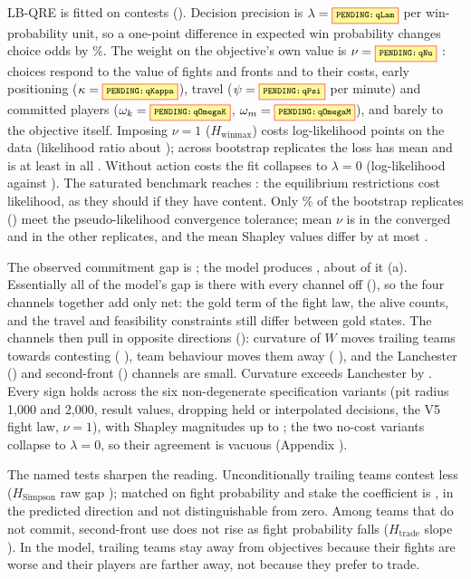 LB-QRE is fitted on  contests ().
Decision precision is $\lambda=\V{qLam}$  per win-probability unit, so a one-point difference in expected win probability changes choice odds by \%.
The weight on the objective's own value is $\nu=\V{qNu}$ : choices respond to the value of fights and fronts and to their costs, early positioning ($\kappa=\V{qKappa}$), travel ($\psi=\V{qPsi}$ per minute) and committed players ($\omega_k=\V{qOmegaK}$, $\omega_m=\V{qOmegaM}$), and barely to the objective itself.
Imposing $\nu=1$ ($H_{\mathrm{winmax}}$) costs  log-likelihood points on the data (likelihood ratio about ); across bootstrap replicates the loss has mean   and is at least  in all .
Without action costs the fit collapses to $\lambda=0$ (log-likelihood  against ).
The saturated benchmark reaches : the equilibrium restrictions cost likelihood, as they should if they have content.
Only \% of the  bootstrap replicates () meet the pseudo-likelihood convergence tolerance; mean $\nu$ is  in the converged and  in the other replicates, and the mean Shapley values differ by at most \pp.

The observed commitment gap is \pp{} ; the model produces \pp{} , about  of it (a).
Essentially all of the model's gap is there with every channel off (\pp), so the four channels together add only \pp{} net: the gold term of the fight law, the alive counts, and the travel and feasibility constraints still differ between gold states.
The channels then pull in opposite directions (): curvature of $W$ moves trailing teams towards contesting (\pp{} ), team behaviour moves them away (\pp{} ), and the Lanchester () and second-front () channels are small.
Curvature exceeds Lanchester by \pp{} .
Every sign holds across the six non-degenerate specification variants (pit radius 1,000 and 2,000, result values, dropping held or interpolated decisions, the V5 fight law, $\nu=1$), with Shapley magnitudes up to \pp{}; the two no-cost variants collapse to $\lambda=0$, so their agreement is vacuous (Appendix ).

The named tests sharpen the reading.
Unconditionally trailing teams contest less ($H_{\mathrm{Simpson}}$ raw gap  ); matched on fight probability and stake the coefficient is  , in the predicted direction and not distinguishable from zero.
Among teams that do not commit, second-front use does not rise as fight probability falls ($H_{\mathrm{trade}}$ slope  ).
In the model, trailing teams stay away from objectives because their fights are worse and their players are farther away, not because they prefer to trade.

